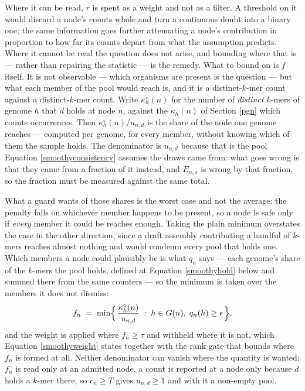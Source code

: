 \documentclass[pdflatex,sn-vancouver-num]{sn-jnl}
\begin{document}
    Where it can be read, $r$ is spent as a weight and not as a filter. A threshold on it would
    discard a node's counts whole and turn a continuous doubt into a binary one; the same information
    goes further attenuating a node's contribution in proportion to how far its counts depart from
    what the assumption predicts. Where it cannot be read the question does not arise, and bounding
    where that is --- rather than repairing the statistic --- is the remedy. What to bound on is $f$
    itself. It is not observable --- which organisms are present is the question --- but what each
    member of the pool would reach is, and it is a distinct-$k$-mer count against a distinct-$k$-mer
    count. Write $\kappa^{\circ}_h(n)$ for the number of \emph{distinct} $k$-mers of genome $h$ that
    $d$ holds at node $n$, against the $\kappa_h(n)$ of Section \ref{pgn} which counts occurrences.
    Then $\kappa^{\circ}_h(n) / u_{n,d}$ is the share of the node one genome reaches --- computed per
    genome, for every member, without knowing which of them the sample holds. The denominator is
    $u_{n,d}$ because that is the pool Equation \eqref{smoothyconsistency} assumes the draws came
    from: what goes wrong is that they came from a fraction of it instead, and $E_{n,s}$ is wrong by
    that fraction, so the fraction must be measured against the same total.

    What a guard wants of those shares is the worst case and not the average: the penalty falls on
    whichever member happens to be present, so a node is safe only if \emph{every} member it could be
    reaches enough. Taking the plain minimum overstates the case in the other direction, since a
    draft assembly contributing a handful of $k$-mers reaches almost nothing and would condemn every
    pool that holds one. Which members a node could plausibly be is what $q_n$ says --- each genome's
    share of the $k$-mers the pool holds, defined at Equation \eqref{smoothyhold} below and summed
    there from the same counters --- so the minimum is taken over the members it does not dismiss:
    \begin{equation}\label{smoothyreach}
        f_n \;=\; \min \Bigl\{\, \frac{\kappa^{\circ}_h(n)}{u_{n,d}} \;:\;
            h \in G(n), \; q_n(h) \geq \epsilon \,\Bigr\} ,
    \end{equation}
    and the weight is applied where $f_n \geq \tau$ and withheld where it is not, which
    Equation \eqref{smoothyweight} states together with the rank gate that bounds where $f_n$ is
    formed at all. Neither denominator can vanish where the quantity is wanted: $f_n$ is read only at an admitted node, a count is
    reported at a node only because $d$ holds a $k$-mer there, so $c_n \geq T$ gives
    $u_{n,d} \geq 1$ and with it a non-empty pool.
\end{document}
